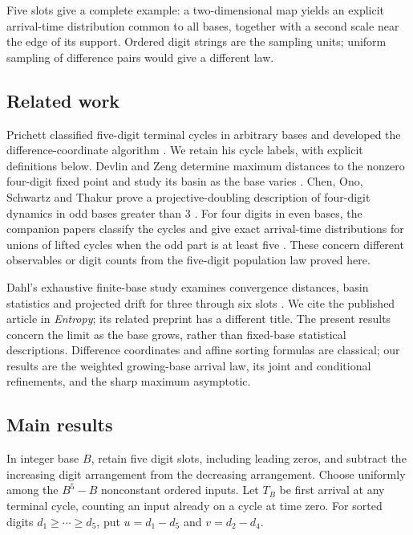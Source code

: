 \documentclass[11pt]{amsart}
\begin{document}
Five slots give a complete example: a two-dimensional map yields an explicit arrival-time distribution common to all bases, together with a second scale near the edge of its support. Ordered digit strings are the sampling units; uniform sampling of difference pairs would give a different law.

\subsection{Related work}

Prichett classified five-digit terminal cycles in arbitrary bases and developed the difference-coordinate algorithm \cite[Sections~1--4, especially Tables~4.1--4.3]{Pri}. We retain his cycle labels, with explicit definitions below. Devlin and Zeng determine maximum distances to the nonzero four-digit fixed point and study its basin as the base varies \cite[Theorems~1 and~2]{DZ}. Chen, Ono, Schwartz and Thakur prove a projective-doubling description of four-digit dynamics in odd bases greater than \(3\) \cite[Theorems~1 and~24]{COST}. For four digits in even bases, the companion papers classify the cycles \cite{G1} and give exact arrival-time distributions for unions of lifted cycles when the odd part is at least five \cite{G2}. These concern different observables or digit counts from the five-digit population law proved here.

Dahl's exhaustive finite-base study examines convergence distances, basin statistics and projected drift for three through six slots \cite[Sections~2--3 and Appendix~A]{Dahl}. We cite the published article in \emph{Entropy}; its related preprint \cite{DahlPre} has a different title. The present results concern the limit as the base grows, rather than fixed-base statistical descriptions. Difference coordinates and affine sorting formulas are classical; our results are the weighted growing-base arrival law, its joint and conditional refinements, and the sharp maximum asymptotic.

\subsection{Main results}

In integer base \(B\), retain five digit slots, including leading zeros, and subtract the increasing digit arrangement from the decreasing arrangement. Choose uniformly among the \(B^5-B\) nonconstant ordered inputs. Let \(T_B\) be first arrival at any terminal cycle, counting an input already on a cycle at time zero. For sorted digits \(d_1\ge\cdots\ge d_5\), put \(u=d_1-d_5\) and \(v=d_2-d_4\).
\end{document}
